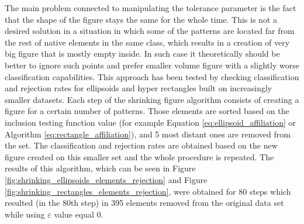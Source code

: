 The main problem connected to manipulating the tolerance parameter is the fact that the shape of the figure stays the same for the whole time. This is not a desired solution in a situation in which some of the patterns are located far from the rest of native elements in the same class, which results in a creation of very big figure that is mostly empty inside. In such case it theoretically should be better to ignore such points and prefer smaller volume figure with a slightly worse classification capabilities. This approach has been tested by checking classification and rejection rates for ellipsoids and hyper rectangles built on increasingly smaller datasets. Each step of the shrinking figure algorithm consists of creating a figure for a certain number of patterns. Those elements are sorted based on the inclusion testing function value (for example Equation \ref{eq:ellipsoid_affiliation} or Algorithm \ref{eq:rectangle_affiliation}), and 5 most distant ones are removed from the set. The classification and rejection rates are obtained based on the new figure created on this smaller set and the whole procedure is repeated. The results of this algorithm, which can be seen in Figure \ref{fig:shrinking_ellipsoids_elements_rejection} and Figure \ref{fig:shrinking_rectangles_elements_rejection}, were obtained for 80 steps which resulted (in the 80th step) in 395 elements removed from the original data set while using $\varepsilon$ value equal 0.

